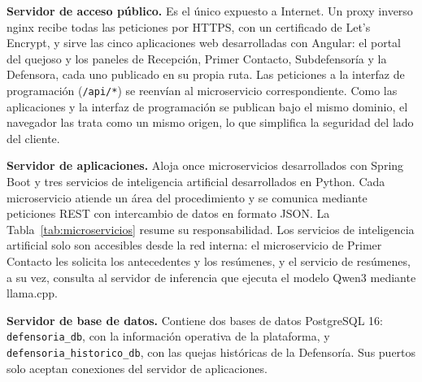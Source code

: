 \textbf{Servidor de acceso público.} Es el único expuesto a Internet. Un proxy inverso nginx recibe todas las peticiones por HTTPS, con un certificado de Let's Encrypt, y sirve las cinco aplicaciones web desarrolladas con Angular: el portal del quejoso y los paneles de Recepción, Primer Contacto, Subdefensoría y la Defensora, cada uno publicado en su propia ruta. Las peticiones a la interfaz de programación (\texttt{/api/*}) se reenvían al microservicio correspondiente. Como las aplicaciones y la interfaz de programación se publican bajo el mismo dominio, el navegador las trata como un mismo origen, lo que simplifica la seguridad del lado del cliente.

\textbf{Servidor de aplicaciones.} Aloja once microservicios desarrollados con Spring Boot y tres servicios de inteligencia artificial desarrollados en Python. Cada microservicio atiende un área del procedimiento y se comunica mediante peticiones REST con intercambio de datos en formato JSON. La Tabla~\ref{tab:microservicios} resume su responsabilidad. Los servicios de inteligencia artificial solo son accesibles desde la red interna: el microservicio de Primer Contacto les solicita los antecedentes y los resúmenes, y el servicio de resúmenes, a su vez, consulta al servidor de inferencia que ejecuta el modelo Qwen3 mediante llama.cpp.

\textbf{Servidor de base de datos.} Contiene dos bases de datos PostgreSQL 16: \texttt{defensoria\_db}, con la información operativa de la plataforma, y \texttt{defensoria\_historico\_db}, con las quejas históricas de la Defensoría. Sus puertos solo aceptan conexiones del servidor de aplicaciones.

